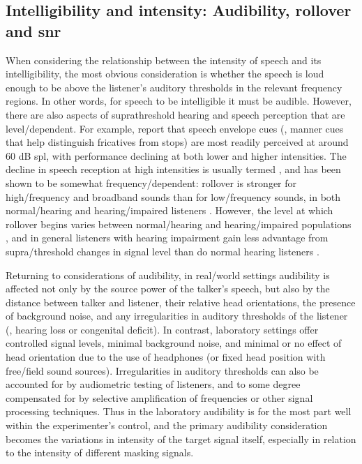 \subsection[Intelligibility and intensity]{Intelligibility and intensity: Audibility, rollover and \ac{snr}\label{sec:IntelIntens}}
When considering the relationship between the intensity of speech and its intelligibility, the most obvious consideration is whether the speech is loud enough to be above the listener’s auditory thresholds in the relevant frequency regions.  In other words, for speech to be intelligible it must be audible.  However, there are also aspects of suprathreshold hearing and speech perception that are level\-/dependent.  For example, \citet{DubnoEtAl2012} report that speech envelope cues (\eg, manner cues that help distinguish fricatives from stops) are most readily perceived at around 60 {dB} \ac{spl}, with performance declining at both lower and higher intensities.  The decline in speech reception at high intensities is usually termed , and has been shown to be somewhat frequency\-/dependent: rollover is stronger for high\-/frequency and broadband sounds than for low\-/frequency sounds, in both normal\-/hearing and hearing\-/impaired listeners \citep{SummersCord2007}.  However, the level at which rollover begins varies between normal\-/hearing and hearing\-/impaired populations \citep{SummersCord2007}, and in general listeners with hearing impairment gain less advantage from supra\-/threshold changes in signal level than do normal hearing listeners \citep{SummersMolis2004}.

Returning to considerations of audibility, in real\-/world settings audibility is affected not only by the source power of the talker’s speech, but also by the distance between talker and listener, their relative head orientations, the presence of background noise, and any irregularities in auditory thresholds of the listener (\ie, hearing loss or congenital deficit).  In contrast, laboratory settings offer controlled signal levels, minimal background noise, and minimal or no effect of head orientation due to the use of headphones (or fixed head position with free\-/field sound sources).  Irregularities in auditory thresholds can also be accounted for by audiometric testing of listeners, and to some degree compensated for by selective amplification of frequencies or other signal processing techniques.  Thus in the laboratory audibility is for the most part well within the experimenter’s control, and the primary audibility consideration becomes the variations in intensity of the target signal itself, especially in relation to the intensity of different masking signals.

